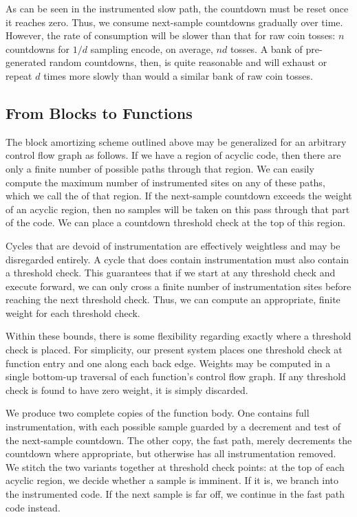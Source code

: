 As can be seen in the instrumented slow path, the countdown must be
reset once it reaches zero.  Thus, we consume next-sample countdowns
gradually over time.  However, the rate of consumption will be slower
than that for raw coin tosses: $n$ countdowns for $1/d$ sampling
encode, on average, $nd$ tosses.  A bank of pre-generated random
countdowns, then, is quite reasonable and will exhaust or repeat $d$
times more slowly than would a similar bank of raw coin tosses.

\subsection{From Blocks to Functions}

The block amortizing scheme outlined above may be generalized for an
arbitrary control flow graph as follows.  If we have a region of
acyclic code, then there are only a finite number of possible paths
through that region.  We can easily compute the maximum number of
instrumented sites on any of these paths, which we call the
 of that region.  If the next-sample countdown exceeds
the weight of an acyclic region, then no samples will be taken on this
pass through that part of the code.  We can place a countdown
threshold check at the top of this region.

Cycles that are devoid of instrumentation are effectively weightless
and may be disregarded entirely.  A cycle that does contain
instrumentation must also contain a threshold check.  This guarantees
that if we start at any threshold check and execute forward, we can
only cross a finite number of instrumentation sites before reaching
the next threshold check.  Thus, we can compute an appropriate, finite
weight for each threshold check.

Within these bounds, there is some flexibility regarding exactly where
a threshold check is placed.  For simplicity, our present system
places one threshold check at function entry and one along each back
edge.  Weights may be computed in a single bottom-up traversal of each
function's control flow graph.  If any threshold check is found to
have zero weight, it is simply discarded.

We produce two complete copies of the function body.  One contains
full instrumentation, with each possible sample guarded by a decrement
and test of the next-sample countdown.  The other copy, the fast path,
merely decrements the countdown where appropriate, but otherwise has
all instrumentation removed.  We stitch the two variants together at
threshold check points: at the top of each acyclic region, we decide
whether a sample is imminent.  If it is, we branch into the
instrumented code.  If the next sample is far off, we continue in the
fast path code instead.


